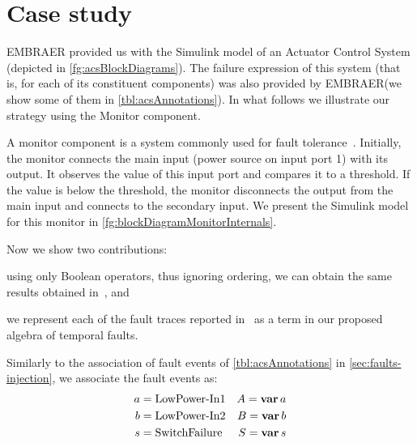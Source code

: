 \documentclass[12pt,openright,twoside,a4paper,oldfontcommands,english,brazil,final]{abntex2}
\theoremstyle{theo}
\newcommand{\EMBRAER}{EMBRAER\xspace}
\newcommand{\simulink}{Simulink\xspace}
\def\varop{\ensuremath\operatorname{\mathbf{var}}}
\newcommand{\var}[1]{\ensuremath\varop #1}
\begin{document}
\chapter{Case study}
\label{chap:case-study}

\EMBRAER provided us with the \simulink model of an Actuator Control System (depicted in \cref{fg:acsBlockDiagrams}).
The failure expression of this system (that is, for each of its constituent components) was also provided by \EMBRAER (we show some of them in \cref{tbl:acsAnnotations}).
In what follows we illustrate our strategy using the Monitor component.

A monitor component is a system commonly used for fault tolerance~\cite{ONB2002,KK2007}.
Initially, the monitor connects the main input (power source on input port 1) with its output.
It observes the value of this input port and compares it to a threshold.
If the value is below the threshold, the monitor disconnects the output from the main input and connects to the secondary input.
We present the \simulink model for this monitor in \cref{fg:blockDiagramMonitorInternals}.


Now we show two contributions:
\begin{alineasinline}
  \item using only Boolean operators, thus ignoring ordering, we can obtain the same results obtained in~\cite{DM2012}, and
  \item we represent each of the fault traces reported in~\cite{DM2012} as a term in our proposed algebra of temporal faults.
\end{alineasinline}
Similarly to the association of fault events of \cref{tbl:acsAnnotations} in \cref{sec:faults-injection}, we associate the fault events as:
%
\begin{align*}
a &= \text{LowPower-In1}& A = \var a\\
b &= \text{LowPower-In2}& B = \var b\\
s &= \text{SwitchFailure}& S = \var s
\end{align*}
\end{document}
